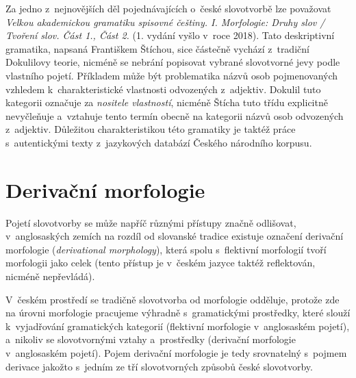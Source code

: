 Za jedno z~nejnovějších děl pojednávajících o~české slovotvorbě lze
považovat \emph{Velkou akademickou gramatiku spisovné češtiny. I.
Morfologie: Druhy slov / Tvoření slov. Část 1., Část 2.} (1. vydání
vyšlo v~roce 2018). Tato deskriptivní gramatika, napsaná Františkem
Štíchou, sice částečně vychází z~tradiční Dokulilovy teorie, nicméně se
nebrání popisovat vybrané slovotvorné jevy podle vlastního pojetí.
Příkladem může být problematika názvů osob pojmenovaných vzhledem
k~charakteristické vlastnosti odvozených z~adjektiv. Dokulil tuto
kategorii označuje za \emph{nositele vlastností}, nicméně Štícha tuto
třídu explicitně nevyčleňuje a~vztahuje tento termín obecně na kategorii
názvů osob odvozených z~adjektiv. Důležitou charakteristikou této
gramatiky je taktéž práce s~autentickými texty z~jazykových databází
Českého národního korpusu.~\parencite{sticha18}

\hypertarget{derivaux10dnuxed-morfologie}{%
\section{Derivační morfologie}\label{derivaux10dnuxed-morfologie}}

Pojetí slovotvorby se může napříč různými přístupy značně odlišovat,
v~anglosaských zemích na rozdíl od slovanské tradice existuje označení
derivační morfologie (\emph{derivational morphology}), která spolu
s~flektivní morfologií tvoří morfologii jako celek (tento přístup je
v~českém jazyce taktéž reflektován, nicméně nepřevládá).
\parencite{lieber14}

V~českém prostředí se tradičně slovotvorba od morfologie odděluje,
protože zde na úrovni morfologie pracujeme výhradně s~gramatickými
prostředky, které slouží k~vyjadřování gramatických kategorií (flektivní
morfologie v~anglosaském pojetí), a~nikoliv se slovotvornými vztahy
a~prostředky (derivační morfologie v~anglosaském pojetí). Pojem derivační
morfologie je tedy srovnatelný s~pojmem derivace jakožto s~jedním ze tří
slovotvorných způsobů české slovotvorby.
